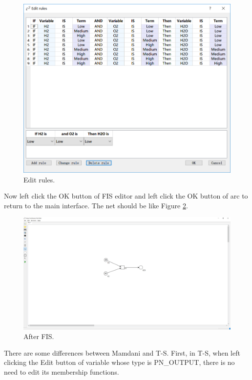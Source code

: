 \documentclass[journal,a4paper,onecolumn]{article}
\begin{document}
\begin{figure}[!hbt]
	\begin{center}
		\includegraphics[width=\columnwidth]{fig10}
		\caption{Edit rules.}
		\label{fig:Edit rules}
	\end{center}
\end{figure}

Now left click the OK button of FIS editor and left click the OK button of arc to return to the main interface. The net should be like Figure \ref{fig:After FIS}.

\begin{figure}[!hbt]
	\begin{center}
		\includegraphics[width=\columnwidth]{fig6}
		\caption{After FIS.}
		\label{fig:After FIS}
	\end{center}
\end{figure}
\clearpage
There are some differences between Mamdani and T-S. First, in T-S, when left clicking the Edit button of variable whose type is PN\_OUTPUT, there is no need to edit its membership functions.
\end{document}
